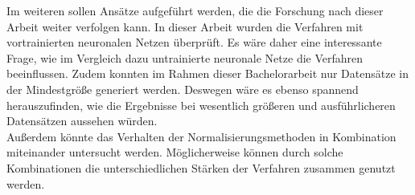 Im  weiteren sollen Ansätze aufgeführt werden, die die Forschung nach dieser Arbeit weiter verfolgen kann. In dieser Arbeit wurden die Verfahren mit vortrainierten neuronalen Netzen überprüft. Es wäre daher eine interessante Frage, wie im Vergleich dazu untrainierte neuronale Netze die Verfahren beeinflussen. Zudem konnten im Rahmen dieser Bachelorarbeit nur Datensätze in der Mindestgröße generiert werden. Deswegen wäre es ebenso spannend herauszufinden, wie die Ergebnisse bei wesentlich größeren und ausführlicheren Datensätzen aussehen würden.\\
Außerdem könnte das Verhalten der Normalisierungsmethoden in Kombination miteinander untersucht werden. Möglicherweise können durch solche Kombinationen die unterschiedlichen Stärken der Verfahren zusammen genutzt werden.  
